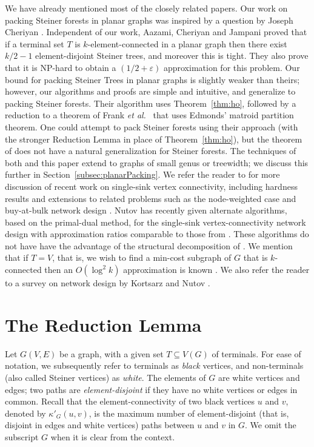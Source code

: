 \documentclass[11pt]{article}
\newcommand{\elconn}{\kappa'}
\newcommand{\etal}{{\em et al.}\ }
\def\eps{\varepsilon}
\begin{document}
\smallskip
{} We have already mentioned most of the
closely related papers. Our work on packing Steiner forests in planar
graphs was inspired by a question by Joseph Cheriyan
\cite{Cheriyan}. Independent of our work, Aazami, Cheriyan and Jampani
\cite{ACJ08} proved that if a terminal set $T$ is
$k$-element-connected in a planar graph then there exist $k/2 -1$
element-disjoint Steiner trees, and moreover this is tight. They also
prove that it is NP-hard to obtain a $(1/2+\eps)$ approximation for
this problem. Our bound for packing Steiner Trees in planar graphs is
slightly weaker than theirs; however, our algorithms and proofs are
simple and intuitive, and generalize to packing Steiner forests. Their
algorithm uses Theorem~\ref{thm:ho}, followed by a reduction to a
theorem of Frank \etal \cite{FKK} that uses Edmonds' matroid partition
theorem. One could attempt to pack Steiner forests using their
approach (with the stronger Reduction Lemma in place of
Theorem~\ref{thm:ho}), but the theorem of \cite{FKK} does not have a
natural generalization for Steiner forests.  The techniques of both
\cite{ACJ08} and this paper extend to graphs of small genus or
treewidth; we discuss this further in
Section~\ref{subsec:planarPacking}.  We refer the reader to
\cite{ChakCK08,ChuzhoyK08,ChekuriK08} for more discussion of recent
work on single-sink vertex connectivity, including hardness results
\cite{ChakCK08} and extensions to related problems such as the
node-weighted case \cite{ChuzhoyK08} and buy-at-bulk network design
\cite{ChekuriK08}. Nutov \cite{Nutov09} has recently given alternate
algorithms, based on the primal-dual method, for the single-sink
vertex-connectivity network design with approximation ratios
comparable to those from \cite{ChuzhoyK08}. These algorithms do not
have have the advantage of the structural decomposition of
\cite{ChuzhoyK08}. We mention that if $T=V$, that is, we wish to find
a min-cost subgraph of $G$ that is $k$-connected then an $O(\log^2 k)$
approximation is known \cite{FakL08,KortsarzN05,CheriyanVV03}. We also
refer the reader to a survey on network design by Kortsarz and Nutov
\cite{KortsarzN_survey}.

\section{The Reduction Lemma}
Let $G(V,E)$ be a graph, with a given set $T \subseteq V(G)$ of
terminals. For ease of notation, we subsequently refer to terminals as
\emph{black} vertices, and non-terminals (also called Steiner
vertices) as \emph{white}. The elements of $G$ are white vertices and
edges; two paths are \emph{element-disjoint} if they have no white
vertices or edges in common. Recall that the element-connectivity of
two black vertices $u$ and $v$, denoted by $\elconn_G(u,v)$, is the
maximum number of element-disjoint (that is, disjoint in edges and
white vertices) paths between $u$ and $v$ in $G$.  We omit the
subscript $G$ when it is clear from the context.
\end{document}
